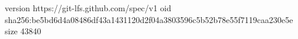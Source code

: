 version https://git-lfs.github.com/spec/v1
oid sha256:be5bd6d4a08486df43a1431120d2f04a3803596c5b52b78e55f7119caa230e5e
size 43840
